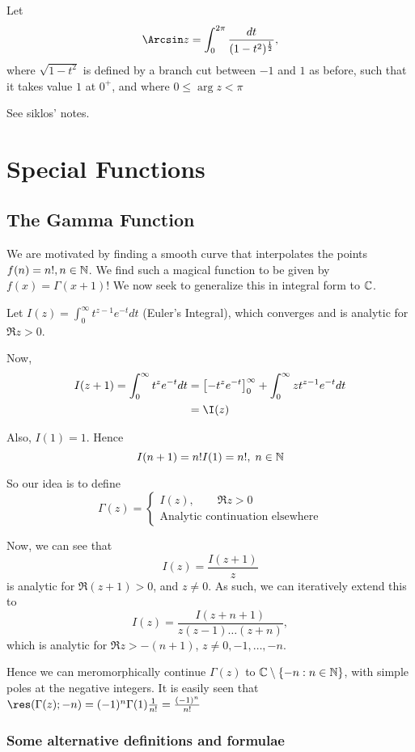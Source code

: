 \documentclass[a4paper]{article}
\begin{document}
Let \[
	\Arcsin z = \int_{0}^{2\pi} \frac{dt}{(1-t^2)^{\frac{1}{2}}}
,\] where $\sqrt{1-t^2} $ is defined by a branch cut between $-1$ and $1$ as before, such that it takes value  $1$ at $0^{+}$, and where $0 \le  \arg z < \pi$

See siklos' notes.

\section{Special Functions}

\subsection{The Gamma Function}

We are motivated by finding a smooth curve that interpolates the points $f(n) = n!, n \in \mathbb{N}$. We find such a magical function to be given by $f(x) = \Gamma(x+1)$! We now seek to generalize this in integral form to $\mathbb{C}$.

Let  $I(z) = \int_{0}^{\infty} t^{z-1} e^{-t} dt$ (Euler's Integral), which converges and is analytic for $\Re z >0$. 

Now, 
\begin{align*}
	I(z+1) = \int_{0}^{\infty} t^{z}e^{-t} dt &= \left[ -t^{z}e^{-t} \right]_{0}^{\infty} + \int_0^{\infty} zt^{z-1}e^{-t} dt \\
	&= \I(z)
\end{align*}

Also, $I(1) = 1$. Hence  \[
	I(n+1) = n!I(1) = n!, \; n\in \mathbb{N}
\]

So our idea is to define
\[
	\Gamma(z) = \begin{cases}
		I(z), \qquad \Re z >0 \\
		\text{Analytic continuation elsewhere}
	\end{cases}
\] 

Now, we can see that  \[
	I(z) = \frac{I(z+1)}{z}
\] is analytic for $\Re (z+1) > 0$, and  $z\neq 0$. As such, we can iteratively extend this to
\[
	I(z) = \frac{I(z+n+1)}{z(z-1)\ldots(z+n)}
,\] which is analytic for $\Re z > -(n+1)$, $z\neq 0, -1, \ldots, -n$.

Hence we can meromorphically continue $\Gamma(z)$ to $\mathbb{C}\setminus \{-n: n\in \mathbb{N}\} $, with simple poles at the negative integers. It is easily seen that $\res(\Gamma(z); -n) = (-1)^{n} \Gamma(1) \frac{1}{n!} = \frac{(-1)^{n}}{n!} $

\subsubsection*{Some alternative definitions and formulae}
\end{document}
